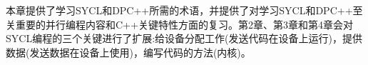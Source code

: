 本章提供了学习SYCL和DPC++所需的术语，并提供了对学习SYCL和DPC++至关重要的并行编程内容和C++关键特性方面的复习。第2章、第3章和第4章会对SYCL编程的三个关键进行了扩展:给设备分配工作(发送代码在设备上运行)，提供数据(发送数据在设备上使用)，编写代码的方法(内核)。\par

\newpage